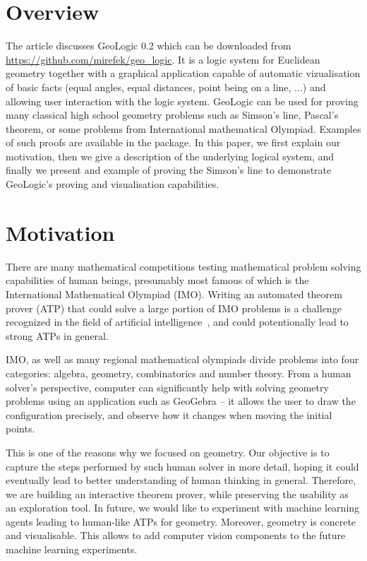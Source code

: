 \documentclass[runningheads]{llncs}
\begin{document}
\section{Overview}

The article discusses GeoLogic 0.2 which can be downloaded from
\url{https://github.com/mirefek/geo_logic}. It is a logic system for
Euclidean geometry together with a graphical application capable of
automatic vizualisation of basic facts (equal angles, equal distances,
point being on a line, ...) and allowing user interaction with the
logic system. GeoLogic can be used for proving many classical high
school geometry problems such as Simson's line, Pascal's theorem, or
some problems from International mathematical Olympiad. Examples of
such proofs are available in the package. In this paper, we first
explain our motivation, then we give a description of the underlying
logical system, and finally we present and example of proving the
Simson's line to demonstrate GeoLogic's proving and visualisation
capabilities.

\section{Motivation}

There are many mathematical competitions testing mathematical problem
solving capabilities of human beings, presumably most famous of which
is the International Mathematical Olympiad (IMO). Writing an automated
theorem prover (ATP) that could solve a large portion of IMO problems is a
challenge recognized in the field of artificial
intelligence~\cite{IMO-Challenge}, and could potentionally lead to
strong ATPs in general.

IMO, as well as many regional mathematical olympiads divide problems
into four categories: algebra, geometry, combinatorics and number theory.
From a human solver's perspective, computer can significantly help
with solving geometry problems using an application such as GeoGebra --
it allows the user to draw the configuration precisely, and observe
how it changes when moving the initial points.

This is one of the reasons why we focused on geometry.
Our objective is to capture the steps performed by such human solver
in more detail, hoping it could eventually lead to better
understanding of human thinking in general.
Therefore, we are building an interactive
theorem prover, while preserving the usability as an exploration
tool. In future, we would like to experiment with machine learning
agents leading to human-like ATPs for geometry. Moreover, geometry is
concrete and visualisable. This allows to add computer vision
components to the future machine learning experiments.
\end{document}
